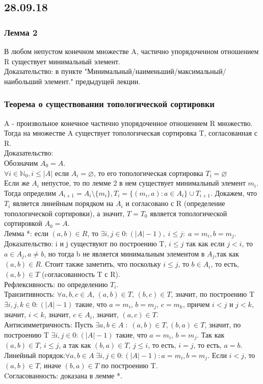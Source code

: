 \subsection{28.09.18}
\subsubsection{Лемма 2}
В любом непустом конечном множестве A, частично упорядоченном отношением R существует минимальный элемент. \\
Доказательство: в пункте "Минимальный/наименьший/максимальный/наибольший элемент." предыдущей лекции.
\subsubsection{Теорема о существовании топологической сортировки}
A - произвольное конечное частично упорядоченное отношением R множество. Тогда на множестве A существует топологическая сортировка T, согласованная с R.\\
Доказательство:\\
Обозначим $A_0 = A$.\\
$\forall i \in \mathbb{N}_0, i \leq |A|$ если $A_i = \varnothing$, то его топологическая сортировка $T_i = \varnothing$\\
Если же $A_i$ непустое, то по лемме 2 в нем существует минимальный элемент $m_i$. Тогда определим $A_{i + 1} = A_i \setminus \{m_i\}, T_i = \{(m_i, a) : a \in A_{i}\} \cup T_{i + 1}$. Докажем, что $T_i$ является линейным порядком на $A_i$ и согласовано с R (определение топологической сортировки), а значит, $T = T_0$ является топологической сортировкой $A_0 = A$.\\
Лемма *: если $(a, b) \in R$, то $\exists i, j \in 0:(|A| - 1), \; i \leq j: \; a = m_i, b = m_j$. Доказательство: i и j существуют по построению T, $i \leq j$ так как если $j < i$, то $a \in A_j, a \not= b$, но тогда b не является минимальным элементом в $A_j$,так как $(a, b) \in R$. Стоит также заметить, что поскольку $i \leq j$, то $b \in A_i$, то есть, $(a, b) \in T$ (cогласованность T с R).\\
Рефлексивность: по определению $T_i$.\\
Транзитивность: $\forall a, b, c \in A$, $(a, b) \in T$, $(b, c) \in T$, значит, по построению T $\exists i, j, k \in 0:(|A| - 1)$ такие, что $a = m_i$, $b = m_j$, $c = m_k$, причем $i < j$ и $j < k$, значит, $i < k$, значит, $c \in A_i$, значит, $(a, c) \in T$.\\
Антисимметричность: Пусть $\exists a, b \in A \; : \; (a, b) \in T, (b, a) \in T$, значит, по построению T $\exists i, j \in 0:(|A| - 1)$ такие, что $a = m_i$, $b = m_j$. Так как $(a, b) \in T$, $i \leq j$, а так как $(b, a) \in T$, $j \leq i$, то есть, $i = j$, то есть, $a = b$. \\
Линейный порядок:$\forall a, b \in A \; \exists i, j \in 0:(|A| - 1): a = m_i, b = m_j$. Если $i < j$, то $(a, b) \in T$, иначе $(b, a) \in T$ по построению T. \\
Cогласованность: доказана в лемме *.
